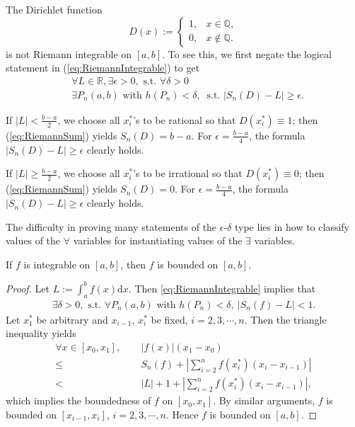 \begin{exm}
  \label{exm:DirichletFuncIsNotIntegrable}
  The Dirichlet function
  \begin{equation}
    \label{eq:DirichletFunc}
    D(x):=
    \begin{cases}
      1, & x\in \mathbb{Q},\\
      0, & x\not \in \mathbb{Q}.
    \end{cases}
  \end{equation}
   is not Riemann integrable on $[a,b]$.
  To see this, we first
   negate the logical statement in (\ref{eq:RiemannIntegrable})
   to get
  \begin{align*}
    &\forall L\in\mathbb{R},
      \exists \epsilon>0, \text{ s.t. } \forall \delta>0 
    \\
    & \exists P_n(a,b) \text{ with } h(P_n)<\delta,\ 
      \text{ s.t. } |S_n(D)-L|\ge \epsilon.
  \end{align*}
  
  If $|L|< \frac{b-a}{2}$,
  we choose all $x_i^*$'s to be rational
  so that $D(x_i^*)\equiv 1$;
  then (\ref{eq:RiemannSum}) yields $S_n(D)=b-a$.
  For $\epsilon=\frac{b-a}{4}$,
   the formula $|S_n(D)-L|\ge \epsilon$ clearly holds.
  
  If $|L|\ge \frac{b-a}{2}$,
  we choose all $x_i^*$'s to be irrational
  so that $D(x_i^*)\equiv 0$;
  then (\ref{eq:RiemannSum}) yields $S_n(D)=0$.
  For $\epsilon=\frac{b-a}{4}$,
   the formula $|S_n(D)-L|\ge \epsilon$ clearly holds.
\end{exm}

\begin{rem}
  The difficulty in proving many statements of the $\epsilon$-$\delta$ type
  lies in how to classify values of the $\forall$ variables
  for instantiating values of the $\exists$ variables.
\end{rem}

\begin{thm}
  \label{thm:integrabilityImpliesBoundedness}
  If $f$ is integrable on $[a,b]$, then $f$ is bounded on $[a,b]$.
\end{thm}
\begin{proof}
  Let $L:=\int_{a}^{b}f(x)\mathrm{d}x$. Then \eqref{eq:RiemannIntegrable}
  implies that
  \begin{align*}
    \exists \delta>0,\text{ s.t. }
    \forall P_{n}(a,b)\text{ with } h(P_{n})<\delta,\
    |S_{n}(f)-L|<1.
  \end{align*}
  Let $x_{1}^{*}$ be arbitrary and
  $x_{i-1}$, $x_{i}^{*}$ be fixed, $i=2,3,\cdots,n$.
  Then the triangle inequality yields
  \begin{align*}
    \forall x\in[x_{0},x_{1}],\quad &\
    |f(x)|(x_{1}-x_{0})\\
    \le &\ S_{n}(f)+
          \left|\sum_{i=2}^{n}f(x_{i}^{*})(x_{i}-x_{i-1})\right|\\
    < &\ |L|+1+\left|\sum_{i=2}^{n}f(x_{i}^{*})(x_{i}-x_{i-1})\right|,
  \end{align*}
  which implies the boundedness of $f$ on $[x_{0},x_{1}]$.
  By similar arguments,
  $f$ is bounded on $[x_{i-1},x_{i}]$, $i=2,3,\cdots, n$.
  Hence $f$ is bounded on $[a,b]$.
\end{proof}

